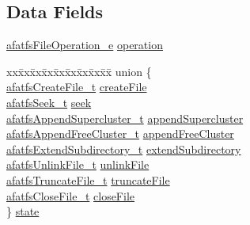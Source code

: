 \subsection*{Data Fields}
\begin{DoxyCompactItemize}
\item 
\hyperlink{asyncfatfs_8c_a722897834d10dfc17bd6e4131c1ad1f8}{afatfs\+File\+Operation\+\_\+e} \hyperlink{structafatfsFileOperation__t_a90c526ba6a2a273f9c290376ddcb5e7b}{operation}
\item 
\begin{tabbing}
xx\=xx\=xx\=xx\=xx\=xx\=xx\=xx\=xx\=\kill
union \{\\
\>\hyperlink{structafatfsCreateFile__t}{afatfsCreateFile\_t} \hyperlink{structafatfsFileOperation__t_a61686b92d334c35aa4d7eace4b9a42f8}{createFile}\\
\>\hyperlink{structafatfsSeek__t}{afatfsSeek\_t} \hyperlink{structafatfsFileOperation__t_a28d8072c3064845606f145af582b1a2e}{seek}\\
\>\hyperlink{structafatfsAppendSupercluster__t}{afatfsAppendSupercluster\_t} \hyperlink{structafatfsFileOperation__t_ac59983b83a4132d74fc9cb7970ea04b7}{appendSupercluster}\\
\>\hyperlink{structafatfsAppendFreeCluster__t}{afatfsAppendFreeCluster\_t} \hyperlink{structafatfsFileOperation__t_a560e68405eeba772517f48029d11762d}{appendFreeCluster}\\
\>\hyperlink{structafatfsExtendSubdirectory__t}{afatfsExtendSubdirectory\_t} \hyperlink{structafatfsFileOperation__t_a9981af5918d4d20d9ba489d345488ffb}{extendSubdirectory}\\
\>\hyperlink{asyncfatfs_8c_a858b041fc345f107a551f503eeac3c37}{afatfsUnlinkFile\_t} \hyperlink{structafatfsFileOperation__t_a1d48c268fd6cd102284aa5a3df27b95a}{unlinkFile}\\
\>\hyperlink{structafatfsTruncateFile__t}{afatfsTruncateFile\_t} \hyperlink{structafatfsFileOperation__t_a0e579a25fef084c4103b313e9eef8ca3}{truncateFile}\\
\>\hyperlink{structafatfsCloseFile__t}{afatfsCloseFile\_t} \hyperlink{structafatfsFileOperation__t_af06b2b06cf906df6d5a250a8ed100863}{closeFile}\\
\} \hyperlink{structafatfsFileOperation__t_a4d2201a3f51cfd641ac9aff3a72efb2a}{state}\\

\end{tabbing}\end{DoxyCompactItemize}


